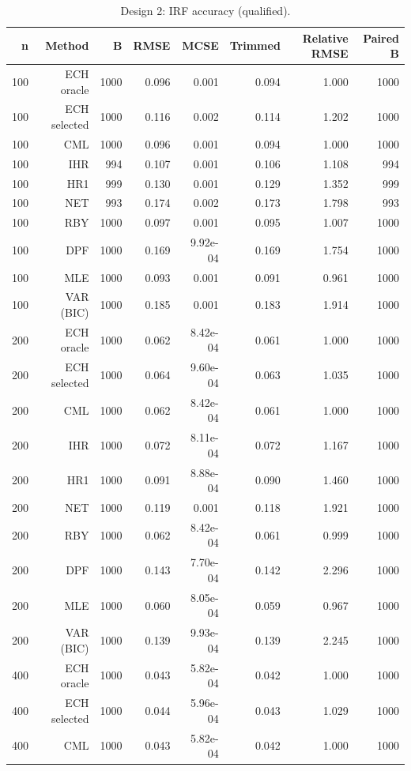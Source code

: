 \begin{table}[p]\centering
\caption{Design 2: IRF accuracy (qualified).}
\small
\begin{tabular}{rrrrrrrr}\toprule
n & Method & B & RMSE & MCSE & Trimmed & Relative RMSE & Paired B \\\midrule
100 & ECH oracle & 1000 & 0.096 & 0.001 & 0.094 & 1.000 & 1000 \\
100 & ECH selected & 1000 & 0.116 & 0.002 & 0.114 & 1.202 & 1000 \\
100 & CML & 1000 & 0.096 & 0.001 & 0.094 & 1.000 & 1000 \\
100 & IHR &  994 & 0.107 & 0.001 & 0.106 & 1.108 &  994 \\
100 & HR1 &  999 & 0.130 & 0.001 & 0.129 & 1.352 &  999 \\
100 & NET &  993 & 0.174 & 0.002 & 0.173 & 1.798 &  993 \\
100 & RBY & 1000 & 0.097 & 0.001 & 0.095 & 1.007 & 1000 \\
100 & DPF & 1000 & 0.169 & 9.92e-04 & 0.169 & 1.754 & 1000 \\
100 & MLE & 1000 & 0.093 & 0.001 & 0.091 & 0.961 & 1000 \\
100 & VAR (BIC) & 1000 & 0.185 & 0.001 & 0.183 & 1.914 & 1000 \\
200 & ECH oracle & 1000 & 0.062 & 8.42e-04 & 0.061 & 1.000 & 1000 \\
200 & ECH selected & 1000 & 0.064 & 9.60e-04 & 0.063 & 1.035 & 1000 \\
200 & CML & 1000 & 0.062 & 8.42e-04 & 0.061 & 1.000 & 1000 \\
200 & IHR & 1000 & 0.072 & 8.11e-04 & 0.072 & 1.167 & 1000 \\
200 & HR1 & 1000 & 0.091 & 8.88e-04 & 0.090 & 1.460 & 1000 \\
200 & NET & 1000 & 0.119 & 0.001 & 0.118 & 1.921 & 1000 \\
200 & RBY & 1000 & 0.062 & 8.42e-04 & 0.061 & 0.999 & 1000 \\
200 & DPF & 1000 & 0.143 & 7.70e-04 & 0.142 & 2.296 & 1000 \\
200 & MLE & 1000 & 0.060 & 8.05e-04 & 0.059 & 0.967 & 1000 \\
200 & VAR (BIC) & 1000 & 0.139 & 9.93e-04 & 0.139 & 2.245 & 1000 \\
400 & ECH oracle & 1000 & 0.043 & 5.82e-04 & 0.042 & 1.000 & 1000 \\
400 & ECH selected & 1000 & 0.044 & 5.96e-04 & 0.043 & 1.029 & 1000 \\
400 & CML & 1000 & 0.043 & 5.82e-04 & 0.042 & 1.000 & 1000 \\

\end{tabular}
\end{table}
